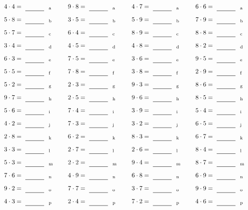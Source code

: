 \documentclass
[
  draft    = true,
  fontsize = 11pt,
  parskip  = half-
]
{scrartcl}
\begin{document}
\par\vfill\par
\begin{align*}
    \pline{4\cdot4}&=\rline{a}
  & \pline{9\cdot8}&=\rline{a}
  & \pline{4\cdot7}&=\rline{a}
  & \pline{6\cdot6}&=\rline{a} \\[1ex]
    \pline{5\cdot8}&=\rline{b}
  & \pline{3\cdot5}&=\rline{b}
  & \pline{5\cdot9}&=\rline{b}
  & \pline{7\cdot9}&=\rline{b} \\[1ex]
    \pline{5\cdot7}&=\rline{c}
  & \pline{6\cdot4}&=\rline{c}
  & \pline{8\cdot9}&=\rline{c}
  & \pline{8\cdot8}&=\rline{c} \\[1ex]
    \pline{3\cdot4}&=\rline{d}
  & \pline{4\cdot5}&=\rline{d}
  & \pline{4\cdot8}&=\rline{d}
  & \pline{8\cdot2}&=\rline{d} \\[1ex]
    \pline{6\cdot3}&=\rline{e}
  & \pline{7\cdot5}&=\rline{e}
  & \pline{3\cdot6}&=\rline{e}
  & \pline{9\cdot5}&=\rline{e} \\[1ex]
    \pline{5\cdot5}&=\rline{f}
  & \pline{7\cdot8}&=\rline{f}
  & \pline{3\cdot8}&=\rline{f}
  & \pline{2\cdot9}&=\rline{f} \\[1ex]
    \pline{5\cdot2}&=\rline{g}
  & \pline{2\cdot3}&=\rline{g}
  & \pline{9\cdot3}&=\rline{g}
  & \pline{8\cdot6}&=\rline{g} \\[1ex]
    \pline{9\cdot7}&=\rline{h}
  & \pline{2\cdot5}&=\rline{h}
  & \pline{9\cdot6}&=\rline{h}
  & \pline{8\cdot5}&=\rline{h} \\[1ex]
    \pline{5\cdot6}&=\rline{i}
  & \pline{7\cdot4}&=\rline{i}
  & \pline{3\cdot9}&=\rline{i}
  & \pline{5\cdot4}&=\rline{i} \\[1ex]
    \pline{4\cdot2}&=\rline{j}
  & \pline{7\cdot3}&=\rline{j}
  & \pline{3\cdot2}&=\rline{j}
  & \pline{6\cdot5}&=\rline{j} \\[1ex]
    \pline{2\cdot8}&=\rline{k}
  & \pline{6\cdot2}&=\rline{k}
  & \pline{8\cdot3}&=\rline{k}
  & \pline{6\cdot7}&=\rline{k} \\[1ex]
    \pline{3\cdot3}&=\rline{l}
  & \pline{2\cdot7}&=\rline{l}
  & \pline{2\cdot6}&=\rline{l}
  & \pline{8\cdot4}&=\rline{l} \\[1ex]
    \pline{5\cdot3}&=\rline{m}
  & \pline{2\cdot2}&=\rline{m}
  & \pline{9\cdot4}&=\rline{m}
  & \pline{8\cdot7}&=\rline{m} \\[1ex]
    \pline{7\cdot6}&=\rline{n}
  & \pline{4\cdot9}&=\rline{n}
  & \pline{6\cdot8}&=\rline{n}
  & \pline{6\cdot9}&=\rline{n} \\[1ex]
    \pline{9\cdot2}&=\rline{o}
  & \pline{7\cdot7}&=\rline{o}
  & \pline{3\cdot7}&=\rline{o}
  & \pline{9\cdot9}&=\rline{o} \\[1ex]
    \pline{4\cdot3}&=\rline{p}
  & \pline{2\cdot4}&=\rline{p}
  & \pline{7\cdot2}&=\rline{p}
  & \pline{4\cdot6}&=\rline{p}
\end{align*}
\end{document}
